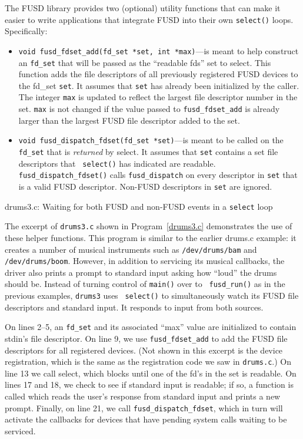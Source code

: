 \documentclass{article}
\begin{document}
The FUSD library provides two (optional) utility functions that can
make it easier to write applications that integrate FUSD into their
own {\tt select()} loops.  Specifically:
\begin{itemize}
\item {\tt void fusd\_fdset\_add(fd\_set *set, int *max)}---is meant
to help construct an {\tt fd\_set} that will be passed as the
``readable fds'' set to select.  This function adds the file
descriptors of all previously registered FUSD devices to the fd\_set
{\tt set}.  It assumes that {\tt set} has already been initialized by
the caller.  The integer {\tt max} is updated to reflect the largest
file descriptor number in the set.  {\tt max} is not changed if the
value passed to {\tt fusd\_fdset\_add} is already larger than the
largest FUSD file descriptor added to the set.

\item {\tt void fusd\_dispatch\_fdset(fd\_set *set)}---is meant to be
called on the {\tt fd\_set} that is {\em returned} by select.  It
assumes that {\tt set} contains a set file descriptors that {\tt
select()} has indicated are readable.  {\tt fusd\_dispatch\_fdset()}
calls {\tt fusd\_dispatch} on every descriptor in {\tt set} that is a
valid FUSD descriptor.  Non-FUSD descriptors in {\tt set} are
ignored.
\end{itemize}


\begin{Program}
\caption{drums3.c: Waiting for both FUSD and non-FUSD events in a
{\tt select} loop}
\label{drums3.c}
\end{Program}

The excerpt of {\tt drums3.c} shown in Program~\ref{drums3.c}
demonstrates the use of these helper functions.  This program is
similar to the earlier drums.c example: it creates a number of musical
instruments such as {\tt /dev/drums/bam} and {\tt /dev/drums/boom}.
However, in addition to servicing its musical callbacks, the driver
also prints a prompt to standard input asking how ``loud'' the drums
should be.  Instead of turning control of {\tt main()} over to {\tt
fusd\_run()} as in the previous examples, {\tt drums3} uses {\tt
select()} to simultaneously watch its FUSD file descriptors and standard
input.  It responds to input from both sources.

On lines 2--5, an {\tt fd\_set} and its associated ``max'' value are
initialized to contain stdin's file descriptor.  On line 9, we use
{\tt fusd\_fdset\_add} to add the FUSD file descriptors for all
registered devices.  (Not shown in this excerpt is the device
registration, which is the same as the registration code we saw in
{\tt drums.c}.)  On line 13 we call select, which blocks until one of
the fd's in the set is readable.  On lines 17 and 18, we check to see
if standard input is readable; if so, a function is called which reads
the user's response from standard input and prints a new prompt.
Finally, on line 21, we call {\tt fusd\_dispatch\_fdset}, which in
turn will activate the callbacks for devices that have pending system
calls waiting to be serviced.
\end{document}
